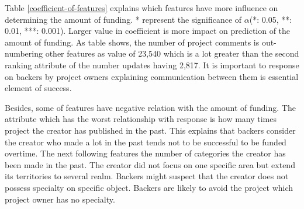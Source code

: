 Table \ref{coefficient-of-features} explains which features have more influence on determining the amount of funding. * represent the significance of $\alpha$(*: 0.05, **: 0.01, ***: 0.001). Larger value in coefficient is more impact on prediction of the amount of funding. As table shows, the number of project comments is out-numbering other features as value of 23,540 which is a lot greater than the second ranking attribute of the number updates having 2,817. It is important to response on backers by project owners explaining communication between them is essential element of success.

Besides, some of features have negative relation with the amount of funding. The attribute which has the worst relationship with response is how many times project the creator has published in the past. This explains that backers consider the creator who made a lot in the past tends not to be successful to be funded overtime. The next following features the number of categories the creator has been made in the past. The creator did not focus on one specific area but extend its territories to several realm. Backers might suspect that the creator does not possess specialty on specific object. Backers are likely to avoid the project which project owner has no specialty.

